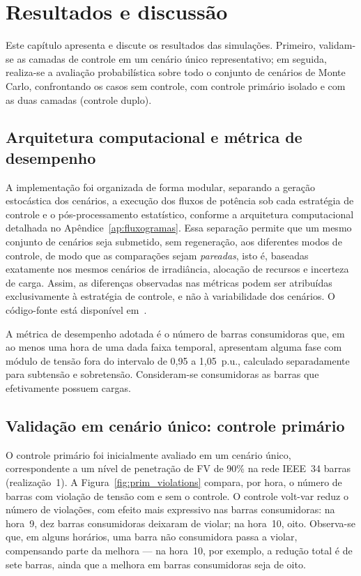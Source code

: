 \chapter{Resultados e discussão}
\label{cap:resultados}

Este capítulo apresenta e discute os resultados das simulações. Primeiro, validam-se as camadas de controle em um cenário único representativo; em seguida, realiza-se a avaliação probabilística sobre todo o conjunto de cenários de Monte Carlo, confrontando os casos sem controle, com controle primário isolado e com as duas camadas (controle duplo).

\section{Arquitetura computacional e métrica de desempenho}
\label{sec:arquitetura_comp}

A implementação foi organizada de forma modular, separando a geração estocástica dos cenários, a execução dos fluxos de potência sob cada estratégia de controle e o pós-processamento estatístico, conforme a arquitetura computacional detalhada no Apêndice~\ref{ap:fluxogramas}. Essa separação permite que um mesmo conjunto de cenários seja submetido, sem regeneração, aos diferentes modos de controle, de modo que as comparações sejam \emph{pareadas}, isto é, baseadas exatamente nos mesmos cenários de irradiância, alocação de recursos e incerteza de carga. Assim, as diferenças observadas nas métricas podem ser atribuídas exclusivamente à estratégia de controle, e não à variabilidade dos cenários. O código-fonte está disponível em~\cite{repositorio}.

A métrica de desempenho adotada é o número de barras consumidoras que, em ao menos uma hora de uma dada faixa temporal, apresentam alguma fase com módulo de tensão fora do intervalo de 0,95 a 1,05~p.u., calculado separadamente para subtensão e sobretensão. Consideram-se consumidoras as barras que efetivamente possuem cargas.

\section{Validação em cenário único: controle primário}
\label{sec:res_primario}

O controle primário foi inicialmente avaliado em um cenário único, correspondente a um nível de penetração de FV de 90\% na rede IEEE~34 barras (realização~1). A Figura~\ref{fig:prim_violations} compara, por hora, o número de barras com violação de tensão com e sem o controle. O controle volt-var reduz o número de violações, com efeito mais expressivo nas barras consumidoras: na hora~9, dez barras consumidoras deixaram de violar; na hora~10, oito. Observa-se que, em alguns horários, uma barra não consumidora passa a violar, compensando parte da melhora --- na hora~10, por exemplo, a redução total é de sete barras, ainda que a melhora em barras consumidoras seja de oito.

